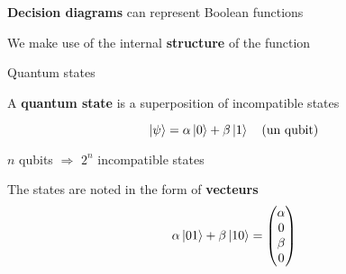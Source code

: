 \begin{frame}
    \textbf{Decision diagrams} can represent Boolean functions

    \vspace{1em}
    \begin{center}

    \vspace{1em}

    We make use of the internal \textbf{structure} of the function
    \end{center}
\end{frame}

\begin{frame}{Quantum states}

    A \textbf{quantum state} is a superposition of incompatible states

    $$\ket{\psi} = \alpha \ket{0} + \beta \ket{1} \quad \text{(un qubit)}$$

    \pause
    \begin{center}
        $n$ qubits $\Rightarrow$ $2^n$ incompatible states
    \end{center}
    The states are noted in the form of \textbf{vecteurs}
    $$\alpha \ket {01} + \beta \ket {10} = \begin{pmatrix}
    \alpha \\ 0 \\ \beta \\ 0
    \end{pmatrix}$$
\end{frame}

